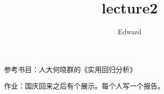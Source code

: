 \documentclass[UTF8]{ctexart}
\title{lecture2}
\author{Edward}
\begin{document}
\maketitle

参考书目：人大何晓群的《实用回归分析》

作业：国庆回来之后有个展示。每个人写一个报告。
\end{document}
